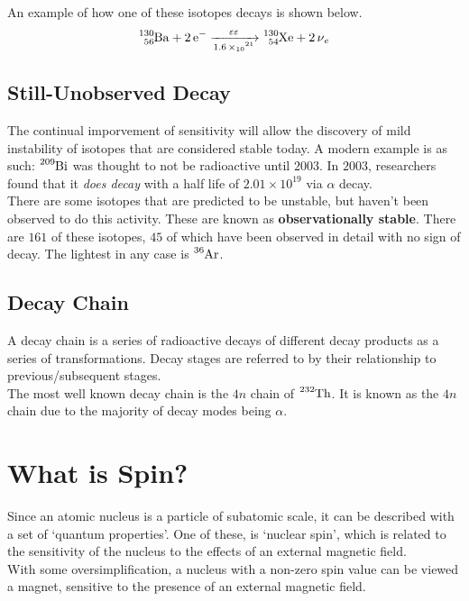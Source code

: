 \documentclass{article}
\begin{document}
\begin{multicols*}{2}
    An example of how one of these isotopes decays is shown below.
    \[
      \ce{^{130}_{56}Ba + 2 e- ->[\varepsilon\varepsilon][1.6 \times 10^{21}] ^{130}_{54}Xe + 2 \nu_{e}}
    \]

    \subsection{Still-Unobserved Decay}
    The continual imporvement of sensitivity will allow the discovery of mild
    instability of isotopes that are considered stable today. A modern example is as
    such: $\ce{^{209}Bi}$ was thought to not be radioactive until $2003$. In $2003$,
    researchers found that it \textit{does decay} with a half life of $2.01 \times 10^{19}$
    via $\alpha$ decay.\\

    There are some isotopes that are predicted to be unstable, but haven't been observed
    to do this activity. These are known as \textbf{observationally stable}. There are
    $161$ of these isotopes, $45$ of which have been observed in detail with no sign of
    decay. The lightest in any case is $\ce{^{36}Ar}$.

    \subsection{Decay Chain}
    A decay chain is a series of radioactive decays of different decay products
    as a series of transformations. Decay stages are referred to by their relationship
    to previous/subsequent stages.\\

    The most well known decay chain is the $4n$ chain of $\ce{^{232}Th}$. It is known
    as the $4n$ chain due to the majority of decay modes being $\alpha$.

    \section{What is Spin?}
    Since an atomic nucleus is a particle of subatomic scale, it can be
    described with a set of `quantum properties'. One of these, is `nuclear
    spin', which is related to the sensitivity of the nucleus to the effects
    of an external magnetic field.\\

    With some oversimplification, a nucleus with a non-zero spin value
    can be viewed a magnet, sensitive to the presence of an external magnetic
    field.\\


\end{multicols*}
\end{document}
